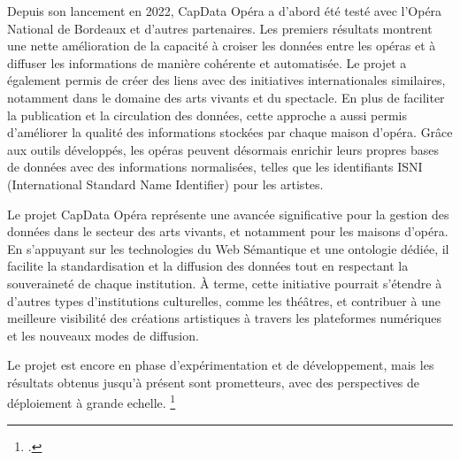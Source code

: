 Depuis son lancement en 2022, CapData Opéra a d'abord été testé avec l'Opéra National de Bordeaux et d'autres partenaires. Les premiers résultats montrent une nette amélioration de la capacité à croiser les données entre les opéras et à diffuser les informations de manière cohérente et automatisée. Le projet a également permis de créer des liens avec des initiatives internationales similaires, notamment dans le domaine des arts vivants et du spectacle.
En plus de faciliter la publication et la circulation des données, cette approche a aussi permis d'améliorer la qualité des informations stockées par chaque maison d'opéra. Grâce aux outils développés, les opéras peuvent désormais enrichir leurs propres bases de données avec des informations normalisées, telles que les identifiants ISNI (International Standard Name Identifier) pour les artistes. \newline

Le projet CapData Opéra représente une avancée significative pour la gestion des données dans le secteur des arts vivants, et notamment pour les maisons d'opéra. En s’appuyant sur les technologies du Web Sémantique et une ontologie dédiée, il facilite la standardisation et la diffusion des données tout en respectant la souveraineté de chaque institution. À terme, cette initiative pourrait s’étendre à d’autres types d’institutions culturelles, comme les théâtres, et contribuer à une meilleure visibilité des créations artistiques à travers les plateformes numériques et les nouveaux modes de diffusion.

Le projet est encore en phase d’expérimentation et de développement, mais les résultats obtenus jusqu'à présent sont prometteurs, avec des perspectives de déploiement à grande echelle. \footcite{CapData_Opera}


